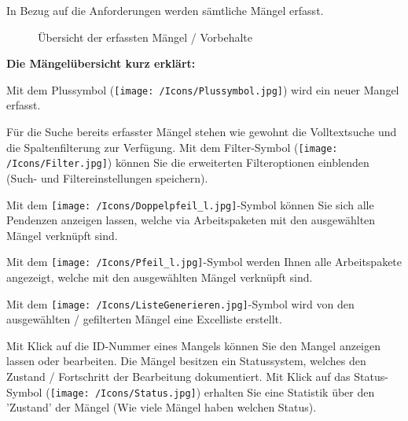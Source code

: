 In Bezug auf die Anforderungen werden sämtliche Mängel erfasst. 

\begin{figure}[H]
\caption{Übersicht der erfassten Mängel / Vorbehalte}
\end{figure}

\textbf{Die Mängelübersicht kurz erklärt:}

\vspace{\baselineskip}

\begin{compactitem}
	\item Mit dem Plussymbol (\texttt{[image: /Icons/Plussymbol.jpg]}) wird ein neuer Mangel erfasst. 
	\item Für die Suche bereits erfasster Mängel stehen wie gewohnt die Volltextsuche und die Spaltenfilterung zur Verfügung. Mit dem Filter-Symbol (\texttt{[image: /Icons/Filter.jpg]}) können Sie die erweiterten Filteroptionen einblenden (Such- und Filtereinstellungen speichern).
	\item Mit dem \texttt{[image: /Icons/Doppelpfeil\_l.jpg]}-Symbol können Sie sich alle Pendenzen anzeigen lassen, welche via Arbeitspaketen mit den ausgewählten Mängel verknüpft sind.
	\item Mit dem \texttt{[image: /Icons/Pfeil\_l.jpg]}-Symbol werden Ihnen alle Arbeitspakete angezeigt, welche mit den ausgewählten Mängel verknüpft sind.
	\item Mit dem \texttt{[image: /Icons/ListeGenerieren.jpg]}-Symbol wird von den ausgewählten / gefilterten Mängel eine Excelliste erstellt.
\end{compactitem}

\vspace{\baselineskip}

Mit Klick auf die ID-Nummer eines Mangels können Sie den Mangel anzeigen lassen oder bearbeiten. Die Mängel besitzen ein Statussystem, welches den Zustand / Fortschritt der Bearbeitung dokumentiert. Mit Klick auf das Status-Symbol (\texttt{[image: /Icons/Status.jpg]}) erhalten Sie eine Statistik über den 'Zustand' der Mängel (Wie viele Mängel haben welchen Status).

